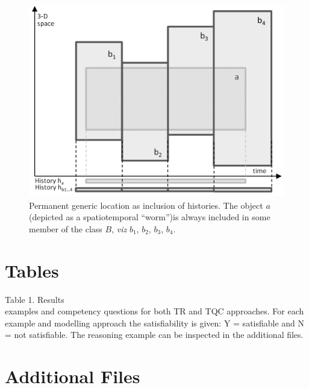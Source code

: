 \documentclass[10pt]{bmc_article}
\newenvironment{bmcformat}{\baselineskip20pt\sloppy\setboolean{publ}{false}}{\baselineskip20pt\sloppy}
\begin{document}
\begin{bmcformat}
\newpage

\begin{figure}[h]
\centering
\includegraphics[width=120mm]{trgraph.png}
\caption{Permanent generic location as inclusion of histories. The object $a$ 
(depicted as a spatiotemporal ``worm'')is always included in some member of 
the class $B$, \emph{viz} $b_1$, $b_2$, $b_3$, $b_4$.}
\label{fig:trgraph}
\end{figure}


\newpage
\section*{Tables}



Table 1. Results \\

examples and competency questions for both TR and TQC approaches. For each example and modelling 
approach the satisfiability is given: Y = satisfiable and N = not satisfiable. The reasoning 
example can be inspected in the additional files. 

 
\newpage



\section*{Additional Files}
  

\end{bmcformat}
\end{document}

